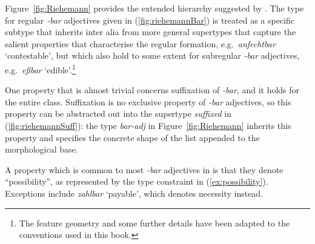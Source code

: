 \documentclass[output=paper
 	        ,biblatex
                ,babelshorthands
                ,newtxmath
                ,draftmode
                ,colorlinks, citecolor=brown
]{langscibook}
\begin{document}
Figure~\ref{fig:Riehemann} provides the extended hierarchy suggested
by \citet{Riehemann98}. The type for regular \textit{-bar} adjectives
given in (\ref{fig:riehemannBar}) is treated as a specific subtype
that inherits inter alia from more general supertypes that capture the
salient properties that characterise the regular formation,
e.g.\ \textit{anfechtbar} `contestable', but which also hold to some
extent for subregular \textit{-bar} adjectives, e.g.\ \textit{eßbar}
`edible'.\footnote{%
  The feature geometry and some further details have been adapted to
  the conventions used in this
  book. 
}

  
One property that is almost trivial concerns suffixation of
\textit{-bar}, and it holds for the entire class. Suffixation is no
exclusive property of \textit{-bar} adjectives, so this property can
be abstracted out into the supertype \textit{suffixed} in
(\ref{fig:riehemannSuff}): the type \textit{bar-adj} in
Figure~\ref{fig:Riehemann} inherits this property and specifies the
concrete shape of the list appended to the morphological base.

\ea
	\label{fig:riehemannSuff}
\z


\begin{sloppypar}
  A property which is common to most \textit{-bar} adjectives in
   is that they denote ``possibility'', as represented by the
  type constraint in (\ref{ex:possibility}). Exceptions include
  \textit{zahlbar} `payable', which denotes necessity instead. 
\end{sloppypar}
\end{document}

